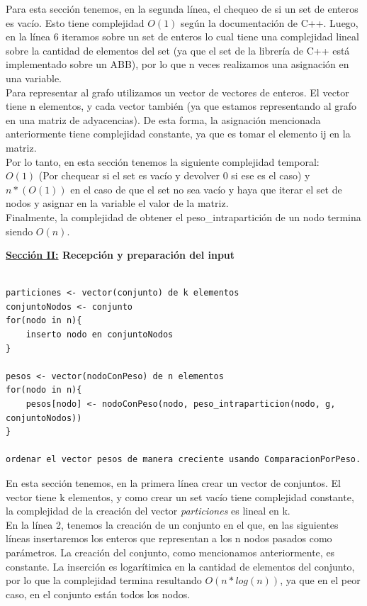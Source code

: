 \documentclass[10pt,a4paper]{article}
\begin{document}
Para esta sección tenemos, en la segunda línea, el chequeo de si un set de enteros es vacío. Esto tiene complejidad $O(1)$ según la documentación de C++.
Luego, en la línea 6 iteramos sobre un set de enteros lo cual tiene una complejidad lineal sobre la cantidad de elementos del set (ya que el set de la librería de C++ está implementado sobre un ABB), por lo que n veces realizamos una asignación en una variable.\\
Para representar al grafo utilizamos un vector de vectores de enteros. El vector tiene n elementos, y cada vector también (ya que estamos representando al grafo en una matriz de adyacencias). De esta forma, la asignación mencionada anteriormente tiene complejidad constante, ya que es tomar el elemento ij en la matriz.\\
Por lo tanto, en esta sección tenemos la siguiente complejidad temporal:\\
$O(1)$ (Por chequear si el set es vacío y devolver 0 si ese es el caso) y $n*(O(1))$ en el caso de que el set no sea vacío y haya que iterar el set de nodos y asignar en la variable el valor de la matriz.\\
Finalmente, la complejidad de obtener el peso\_intrapartición de un nodo termina siendo $O(n)$.


\textbf{\underline{Sección II:} Recepción y preparación del input} 

\begin{lstlisting}[mathescape]

particiones <- vector(conjunto) de k elementos
conjuntoNodos <- conjunto
for(nodo in n){
	inserto nodo en conjuntoNodos
}

pesos <- vector(nodoConPeso) de n elementos
for(nodo in n){
	pesos[nodo] <- nodoConPeso(nodo, peso_intraparticion(nodo, g, conjuntoNodos))
}

ordenar el vector pesos de manera creciente usando ComparacionPorPeso.
\end{lstlisting}


En esta sección tenemos, en la primera línea crear un vector de conjuntos. El vector tiene k elementos, y como crear un set vacío tiene complejidad constante, la complejidad de la creación del vector \textit{particiones} es lineal en k.\\
En la línea 2, tenemos la creación de un conjunto en el que, en las siguientes líneas insertaremos los enteros que representan a los n nodos pasados como parámetros. La creación del conjunto, como mencionamos anteriormente, es constante. La inserción es logarítimica en la cantidad de elementos del conjunto, por lo que la complejidad termina resultando $O(n*log (n))$, ya que en el peor caso, en el conjunto están todos los nodos.
\end{document}
